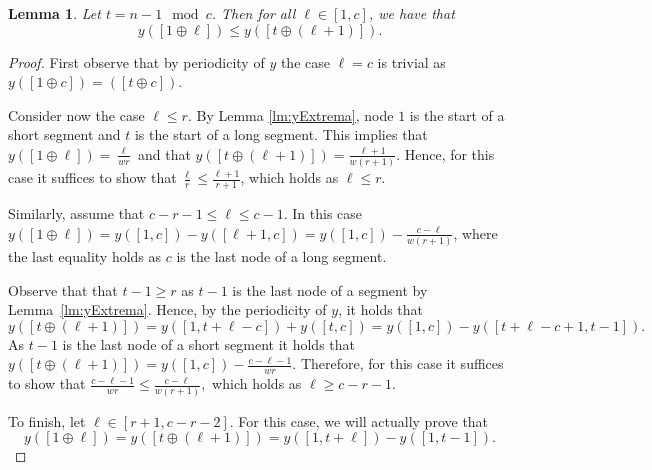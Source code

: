 \documentclass[11pt]{article}
\newtheorem{lemma}{Lemma}[section]
\newcommand\+{\mkern2mu}
\begin{document}
\begin{lemma}\label{lm:ySpread}
    Let $t=n-1 \mod c$. Then for all $\ell \in [1, c]$, we have that
    $$
        y([1\oplus \ell])\leq y([t\oplus (\ell+1)]).
    $$
\end{lemma}
\begin{proof}
    First observe that by periodicity of $y$ the case $\ell=c$ is trivial as $y([1\oplus c])=([t\oplus c])$.
    
    Consider now the case $\ell \leq r$. By Lemma \ref{lm:yExtrema}, node $1$ is the start of a short segment and $t$ is the start of a long segment. This implies that $y([1\oplus \ell]) = \frac{\ell}{w r}$ and that $y([t\oplus (\ell+1)])= \frac{\ell+1}{w (r+1)}$. Hence, for this case it suffices to show that  $\frac{\ell}{r} \le \frac{\ell+1}{r+1}$, which holds as $\ell \le r$.
    
    Similarly, assume that $c-r-1\leq \ell \leq c-1$. In this case $y([1\oplus \ell]) = y([1,c]) - y([\ell+1,c]) = y([1,c]) - \frac{c-\ell}{w(r+1)}$, where the last equality holds as $c$ is the last node of a long segment. 
    
    
    Observe that that $t-1 \ge r$ as $t-1$ is the last node of a segment by Lemma~\ref{lm:yExtrema}. Hence, by the periodicity of $y$, it holds that $$y([t\oplus (\ell+1)]) = y([1,t+\ell -c]) + y([t,c]) = y([1,c]) - y([t+\ell-c+1,t-1]).$$ As $t-1$ is the last node of a short segment it holds that $y([t\oplus (\ell+1)]) = y([1,c]) - \frac{c-\ell-1}{wr}$. Therefore, for this case it suffices to show that  $\frac{c-\ell-1}{wr}\le \frac{c-\ell}{w(r+1)},$ which holds as $\ell \ge c-r-1$.

    To finish, let $\ell \in [r+1, c-r-2]$. For this case, we will actually prove that $$y([1\oplus \ell])= y([t\oplus (\ell+1)])= y([1,t+\ell])-y([1,t-1]).$$
    

\end{proof}
\end{document}
